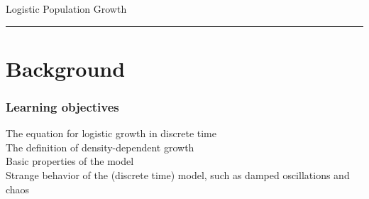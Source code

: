 \documentclass[color=usenames,dvipsnames]{beamer}\usepackage[]{graphicx}\usepackage[]{xcolor}
\begin{document}
\setlength\fboxsep{0pt}


{
\begin{frame}[plain]
  \vspace{-2.35cm}
  \begin{center}
    {\huge Logistic Population Growth } \\
  \end{center}
  \begin{adjustwidth}{-1cm}{-1cm}
    \rule[-7mm]{\paperwidth}{0.5pt}
  \end{adjustwidth}
\end{frame}
}





\section{Background}



\begin{frame}[plain]
  \frametitle{Learning objectives}
  \Large
  The equation for logistic growth in discrete time \\
  \pause
  \vfill
  The definition of density-dependent growth \\
  \pause
  \vfill
  Basic properties of the model \\
  \pause
  \vfill
  Strange behavior of the (discrete time) model, such as damped oscillations and chaos \\
\end{frame}
\end{document}
